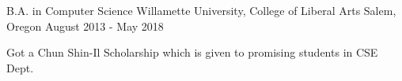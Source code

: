 


\begin{cventries}


\cventry
{B.A. in Computer Science} %
{Willamette University, College of Liberal Arts} %
{Salem, Oregon} %
{August 2013 -  May 2018} %
{ %
\begin{cvitems}
\item {Got a Chun Shin-Il Scholarship which is given to promising students in CSE Dept.}
\end{cvitems}
}


\end{cventries}